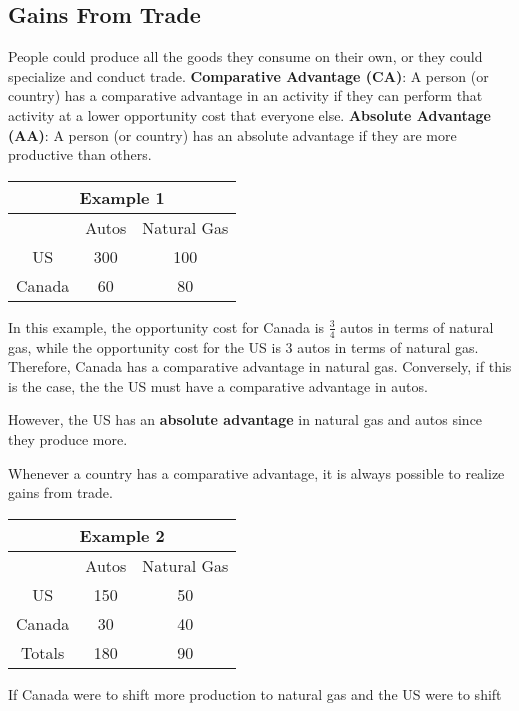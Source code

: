 \documentclass{article}
\begin{document}
\subsection{Gains From Trade}
People could produce all the goods they consume on their own, or they could
specialize and conduct trade.
\newline
\textbf{Comparative Advantage (CA)}: A person (or country) has a comparative
advantage in an activity if they can perform that activity at a lower
opportunity cost that everyone else.
\newline
\textbf{Absolute Advantage (AA)}: A person (or country) has an absolute
advantage if they are more productive than others.
\begin{center}
  \begin{tabular}{|c|c|c|}
    \hline
    \multicolumn{3}{|c|}{Example 1} \\ \hline
           & Autos & Natural Gas  \\ \hline
    US     & 300 & 100            \\ \hline
    Canada & 60  & 80             \\ \hline
  \end{tabular}
\end{center}
In this example, the opportunity cost for Canada is \( \frac{3}{4} \) autos in
terms of natural gas, while the opportunity cost for the US is 3
autos in terms of natural gas. Therefore, Canada has a comparative advantage
in natural gas. Conversely, if this is the case, the the US must have a
comparative advantage in autos. \par
However, the US has an \textbf{absolute advantage} in natural gas and autos
since they produce more. \par
Whenever a country has a comparative advantage, it is always possible to
realize gains from trade.
\begin{center}
  \begin{tabular}{|c|c|c|}
    \hline
    \multicolumn{3}{|c|}{Example 2} \\ \hline
           & Autos & Natural Gas  \\ \hline
    US     & 150 & 50             \\ \hline
    Canada & 30  & 40             \\ \hline
    Totals & 180 & 90             \\ \hline
  \end{tabular}
\end{center}
If Canada were to shift more production to natural gas and the US were to shift
\end{document}
